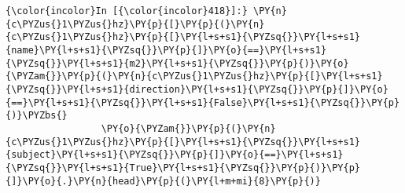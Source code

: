    \begin{Verbatim}[commandchars=\\\{\}]
{\color{incolor}In [{\color{incolor}418}]:} \PY{n}{c\PYZus{}1\PYZus{}hz}\PY{p}{[}\PY{p}{(}\PY{n}{c\PYZus{}1\PYZus{}hz}\PY{p}{[}\PY{l+s+s1}{\PYZsq{}}\PY{l+s+s1}{name}\PY{l+s+s1}{\PYZsq{}}\PY{p}{]}\PY{o}{==}\PY{l+s+s1}{\PYZsq{}}\PY{l+s+s1}{m2}\PY{l+s+s1}{\PYZsq{}}\PY{p}{)}\PY{o}{\PYZam{}}\PY{p}{(}\PY{n}{c\PYZus{}1\PYZus{}hz}\PY{p}{[}\PY{l+s+s1}{\PYZsq{}}\PY{l+s+s1}{direction}\PY{l+s+s1}{\PYZsq{}}\PY{p}{]}\PY{o}{==}\PY{l+s+s1}{\PYZsq{}}\PY{l+s+s1}{False}\PY{l+s+s1}{\PYZsq{}}\PY{p}{)}\PYZbs{}
                 \PY{o}{\PYZam{}}\PY{p}{(}\PY{n}{c\PYZus{}1\PYZus{}hz}\PY{p}{[}\PY{l+s+s1}{\PYZsq{}}\PY{l+s+s1}{subject}\PY{l+s+s1}{\PYZsq{}}\PY{p}{]}\PY{o}{==}\PY{l+s+s1}{\PYZsq{}}\PY{l+s+s1}{True}\PY{l+s+s1}{\PYZsq{}}\PY{p}{)}\PY{p}{]}\PY{o}{.}\PY{n}{head}\PY{p}{(}\PY{l+m+mi}{8}\PY{p}{)}
\end{Verbatim}
